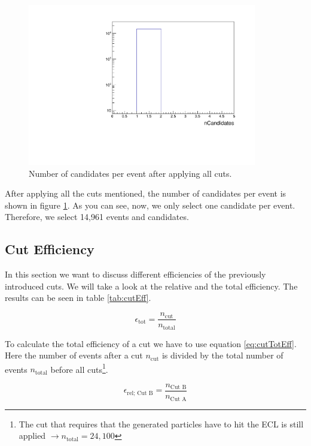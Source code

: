\documentclass[a4paper,11pt,twosided,final,german,openbib,pdftex,listof=totoc,bibliography=totoc]{scrbook}
\begin{document}
\begin{figure}[h!]
	\centering
	\includegraphics[width=10cm]{Cuts/nCand.pdf}
	\caption[Number Of Candidates Per Event (All Cuts)]{Number of candidates per event after applying all cuts.}	
	\label{fig:nCand}
\end{figure}

After applying all the cuts mentioned, the number of candidates per event is shown in figure \ref{fig:nCand}. As you can see, now, we only select one candidate per event. Therefore, we select 14,961 events and candidates.




\subsection{Cut Efficiency}

In this section we want to discuss different efficiencies of the previously introduced cuts. We will take a look at the relative and the total efficiency. The results can be seen in table \ref{tab:cutEff}.

\begin{equation}
	\epsilon_{\textrm{tot}} = \frac{n_{\textrm{cut}}}{n_{\textrm{total}}}
	\label{eq:cutTotEff}
\end{equation}

To calculate the total efficiency of a cut we have to use equation \ref{eq:cutTotEff}. Here the number of events after a cut $n_{\textrm{cut}}$ is divided by the total number of events $n_{\textrm{total}}$ before all cuts\footnote{The cut that requires that the generated particles have to hit the ECL is still applied $\rightarrow n_{\textrm{total}} = 24,100$}.

\begin{equation}
	\epsilon_{\textrm{rel; Cut B}} = \frac{n_{\textrm{Cut B}}}{n_{\textrm{Cut A}}}
	\label{eq:cutRelEff}
\end{equation}
\end{document}
